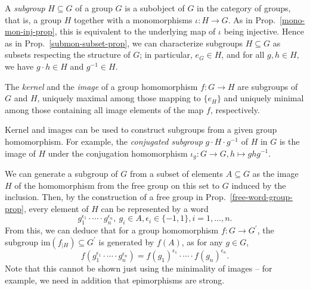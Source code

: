 \documentclass{amsart}
\theoremstyle{plain}
\numberwithin{equation}{section} %
\numberwithin{figure}{section} %
\theoremstyle{plain}
\theoremstyle{plain}
\theoremstyle{plain}
\theoremstyle{plain}
\theoremstyle{plain}
\theoremstyle{plain}
\theoremstyle{remark}
\theoremstyle{remark}
\theoremstyle{remark}
\begin{document}
A \textit{subgroup} $H \subseteq G$ of a group $G$ is a subobject of $G$ in the category of groups, that is, a group $H$ together with a monomorphisms $\iota : H \rightarrow G$. 
As in Prop.~\ref{mono-mon-inj-prop}, this is equivalent to the underlying map of $\iota$ being injective. 
Hence as in Prop.~\ref{submon-subset-prop}, we can characterize subgroups $H \subseteq G$ as subsets respecting the structure of $G$; in particular, $e_G \in H$, and for all $g, h \in H$, we have $g \cdot h \in H$ and $g^{-1} \in H$. 

The \textit{kernel} and the \textit{image} of a group homomorphism $f : G \rightarrow H$ are subgroups of $G$ and $H$, uniquely maximal among those mapping to $\{e_H\}$ and uniquely minimal among those containing all image elements of the map $f$, respectively. 

Kernel and images can be used to construct subgroups from a given group homomorphism. For example, the
\textit{conjugated subgroup} $g \cdot H \cdot g^{-1}$ of $H$ in $G$ is the image of $H$ under the conjugation homomorphism $\iota_g : G \rightarrow G, h \mapsto ghg^{-1}$.
 
We can generate a subgroup of $G$ from a subset of elements $A \subseteq G$ as the image $H$ of the homomorphism from the free group on this set to $G$ induced by the inclusion. 
Then, by the construction of a free group in Prop.~\ref{free-word-group-prop}, every element of $H$ can be represented by a word
\[  g_1^{\epsilon_1} \cdot \cdots \cdot g_n^{\epsilon_n},\ g_i \in A, \epsilon_i \in \{-1, 1\}, i = 1, \ldots, n. \]
From this, we can deduce that for a group homomorphism $f : G \rightarrow G^\prime$, the subgroup $\mathrm{im}(f_{|H}) \subseteq G^\prime$ is generated by $f(A)$, as for any $g \in G$,
\[ f(g_1^{\epsilon_1} \cdot \cdots \cdot g_n^{\epsilon_n}) =
   f(g_1)^{\epsilon_1} \cdot \cdots \cdot f(g_n)^{\epsilon_n}. \] 
Note that this cannot be shown just using the minimality of images -- for example, we need in addition that epimorphisms are strong.
\end{document}
